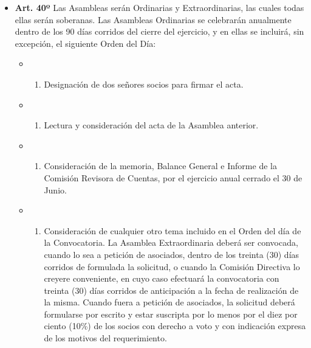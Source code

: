 \documentclass[]{book}
\providecommand{\tightlist}{%
  \setlength{\itemsep}{0pt}\setlength{\parskip}{0pt}}
\begin{document}
\begin{itemize}
\tightlist
\item
  \textbf{Art. 40º} Las Asambleas serán Ordinarias y Extraordinarias,
  las cuales todas ellas serán soberanas. Las Asambleas Ordinarias se
  celebrarán anualmente dentro de los 90 días corridos del cierre del
  ejercicio, y en ellas se incluirá, sin excepción, el siguiente Orden
  del Día:

  \begin{itemize}
  \item
    \begin{enumerate}
    \def\labelenumi{\alph{enumi})}
    \tightlist
    \item
      Designación de dos señores socios para firmar el acta.
    \end{enumerate}
  \item
    \begin{enumerate}
    \def\labelenumi{\alph{enumi})}
    \setcounter{enumi}{1}
    \tightlist
    \item
      Lectura y consideración del acta de la Asamblea anterior.
    \end{enumerate}
  \item
    \begin{enumerate}
    \def\labelenumi{\alph{enumi})}
    \setcounter{enumi}{2}
    \tightlist
    \item
      Consideración de la memoria, Balance General e Informe de la
      Comisión Revisora de Cuentas, por el ejercicio anual cerrado el 30
      de Junio.
    \end{enumerate}
  \item
    \begin{enumerate}
    \def\labelenumi{\alph{enumi})}
    \setcounter{enumi}{3}
    \tightlist
    \item
      Consideración de cualquier otro tema incluido en el Orden del día
      de la Convocatoria. La Asamblea Extraordinaria deberá ser
      convocada, cuando lo sea a petición de asociados, dentro de los
      treinta (30) días corridos de formulada la solicitud, o cuando la
      Comisión Directiva lo creyere conveniente, en cuyo caso efectuará
      la convocatoria con treinta (30) días corridos de anticipación a
      la fecha de realización de la misma. Cuando fuera a petición de
      asociados, la solicitud deberá formularse por escrito y estar
      suscripta por lo menos por el diez por ciento (10\%) de los socios
      con derecho a voto y con indicación expresa de los motivos del
      requerimiento.
    \end{enumerate}
  \end{itemize}
\end{itemize}
\end{document}
